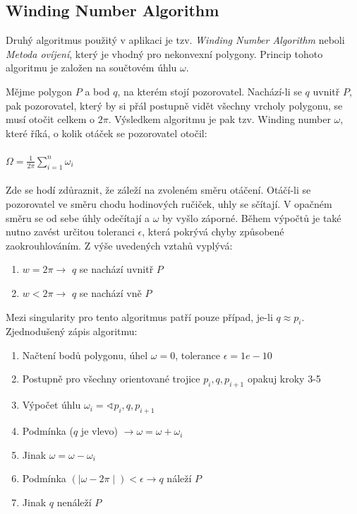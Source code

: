 \documentclass[a4paper, 12pt]{article}
\begin{document}
\subsection{Winding Number Algorithm}
Druhý algoritmus použitý v aplikaci je tzv. \textit{Winding Number Algorithm} neboli \textit{Metoda ovíjení}, který je vhodný pro nekonvexní polygony. Princip tohoto algoritmu je založen na součtovém úhlu $\omega$.

Mějme polygon $P$ a bod $q$, na kterém stojí pozorovatel. Nachází-li se $q$ uvnitř $P$, pak pozorovatel, který by si přál postupně vidět všechny vrcholy polygonu, se musí otočit celkem o $2\pi$. Výsledkem algoritmu je pak tzv. Winding number $\omega$, které říká, o kolik otáček se pozorovatel otočil: \\ \\
$\Omega = \frac{1}{2\pi} \sum_{i=1}^n \omega_i$\\ \\
Zde se hodí zdůraznit, že záleží na zvoleném směru otáčení. Otáčí-li se pozorovatel ve směru chodu hodinových ručiček, uhly se sčítají. V opačném směru se od sebe úhly odečítají a $\omega$ by vyšlo záporné. Během výpočtů je také nutno zavést určitou toleranci $\epsilon$, která pokrývá chyby způsobené zaokrouhlováním.
Z výše uvedených vztahů vyplývá:
\begin{enumerate} 
\item $w = 2\pi \rightarrow$ $q$ se nachází uvnitř $P$
\item  $w < 2\pi \rightarrow$ $q$ se nachází vně $P$
\end{enumerate}

Mezi singularity pro tento algoritmus patří pouze případ, je-li $q\approx p_i$.\\

Zjednodušený zápis algoritmu:

\begin{enumerate}
\item Načtení bodů polygonu, úhel $\omega = 0$, tolerance $\epsilon = 1e-10$
\item Postupně pro všechny orientované trojice $p_i, q, p_{i+1}$ opakuj kroky 3-5
\item 	Výpočet úhlu $\omega_i = \sphericalangle p_i, q, p_{i+1}$
\item 	Podmínka ($q$ je vlevo) $\rightarrow \omega = \omega + \omega_i$
\item 	Jinak $\omega = \omega - \omega_i$
\item Podmínka $(\mid \omega - 2\pi \mid) < \epsilon \rightarrow q$ náleží $P$
\item Jinak  $q$ nenáleží $P$
\end{enumerate}
\end{document}
